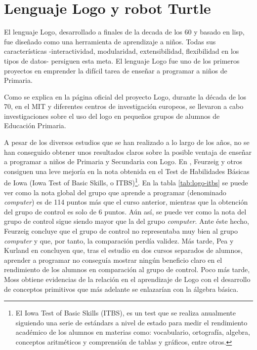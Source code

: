 \section{Lenguaje Logo y robot Turtle}
\label{sec:Logo}

El lenguaje Logo, {\color{red}desarrollado a finales de la decada de los 60} y basado en \Gls{lisp}, fue diseñado como una herramienta de aprendizaje a niños. Todas sus características -interactividad, modularidad, extensibilidad, flexibilidad en los tipos de datos- persiguen esta meta. El lenguaje Logo fue uno de los primeros proyectos en emprender la difícil tarea de enseñar a programar a niños de Primaria.

{\color{blue}
Como se explica en la página oficial del proyecto Logo\cite{logo}, durante la década de los 70, en el \acrfull{MIT} y diferentes centros de investigación europeos, se llevaron a cabo investigaciones sobre el uso del \Gls{logo} en pequeños grupos de alumnos de Educación Primaria.

A pesar de los diversos estudios que se han realizado a lo largo de los años, no se han conseguido obtener unos resultados claros sobre la posible ventaja de enseñar a programar a niños de Primaria y Secundaria con Logo. En \cite{feurzeig1969programming}, Feurzeig y otros consiguen una leve mejoría en la nota obtenida en el Test de Habilidades Básicas de Iowa (Iowa Test of Basic Skills, o ITBS)\footnote{El Iowa Test of Basic Skills (ITBS), es un test que se realiza anualmente siguiendo una serie de estándars a nivel de estado para medir el rendimiento académico de los alumnos en materias como: vocabulario, ortografía, algebra, conceptos aritméticos y comprensión de tablas y gráficos, entre otros.}. En la tabla \ref{tab:logo-itbs} se puede ver como la nota global del grupo que aprende a programar (denominado \emph{computer}) es de 114 puntos más que el curso anterior, mientras que la obtención del grupo de control es solo de 6 puntos. Aún así, se puede ver como la nota del grupo de control sigue siendo mayor que la del grupo \emph{computer}. Ante éste hecho, Feurzeig concluye que el grupo de control no representaba muy bien al grupo \emph{computer} y que, por tanto, la comparación perdía validez.
Más tarde, Pea y Kurland en \cite{pea1984logo} concluyen que, tras el estudio en dos cursos separados de alumnos, aprender a programar no conseguía mostrar ningún beneficio claro en el rendimiento de los alumnos en comparación al grupo de control.
Poco más tarde, Moss \cite{moss1985creating} obtiene evidencias de la relación en el aprendizaje de Logo con el desarrollo de conceptos primitivos que más adelante se enlazarían con la álgebra básica.
}

